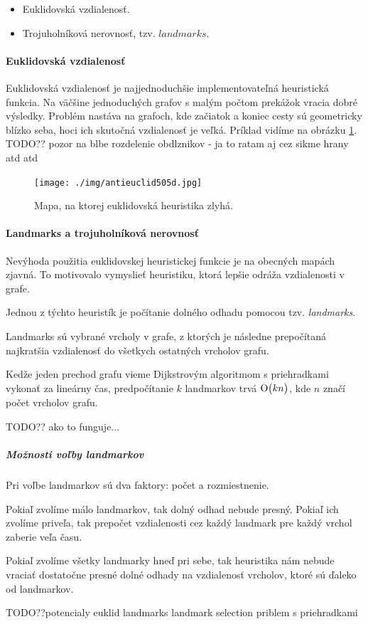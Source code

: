 \begin{itemize}
\item Euklidovská vzdialenosť.
\item Trojuholníková nerovnosť, tzv. $ landmarks $.
\end{itemize}


\paragraph{Euklidovská vzdialenosť}

Euklidovská vzdialenosť je najjednoduchšie implementovateľná heuristická funkcia. Na väčšine jednoduchých grafov s malým počtom prekážok vracia dobré výsledky. Problém nastáva na grafoch, kde začiatok a koniec cesty sú geometricky blízko seba, hoci ich skutočná vzdialenosť je veľká.
Príklad vidíme na obrázku \ref{fig:antieuclid}.
TODO?? pozor na blbe rozdelenie obdlznikov - ja to ratam 
aj cez sikme hrany atd atd


\begin{figure}[H]
\centering
\texttt{[image: ./img/antieuclid505d.jpg]}
\caption{Mapa, na ktorej euklidovská heuristika zlyhá.}
\label{fig:antieuclid}
\end{figure}


\paragraph{Landmarks a trojuholníková nerovnosť}
Nevýhoda použitia euklidovskej heuristickej funkcie je na obecných mapách zjavná. To motivovalo vymyslieť heuristiku, ktorá lepšie odráža vzdialenosti v grafe.

Jednou z týchto heuristík je počítanie dolného odhadu pomocou tzv. {\sl landmarks}. 

Landmarks sú vybrané vrcholy v grafe, z ktorých je následne prepočítaná najkratšia vzdialenosť do všetkych ostatných
vrcholov grafu. 



Kedže jeden prechod grafu vieme Dijkstrovým algoritmom s priehradkami vykonať za lineárny čas, predpočítanie $ k $ landmarkov trvá $ \operatorname{O}\bigl(kn\bigr) $, kde $n$ značí počet vrcholov grafu.


TODO?? ako to funguje...

\subparagraph{Možnosti voľby landmarkov}

Pri voľbe landmarkov sú dva faktory: počet a rozmiestnenie.

\begin{example}
Pokiaľ zvolíme málo landmarkov, tak dolný odhad nebude presný.
Pokiaľ ich zvolíme priveľa, tak prepočet vzdialenosti cez každý landmark pre každý vrchol zaberie veľa času.
\end{example}

\begin{example}
Pokiaľ zvolíme všetky landmarky hneď pri sebe, tak heuristika
nám nebude vraciať dostatočne presné dolné odhady na vzdialenosť vrcholov, ktoré sú ďaleko od landmarkov.
\end{example}


TODO??potencialy euklid landmarks landmark selection priblem s priehradkami